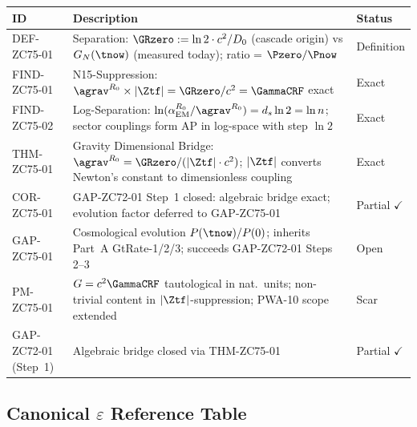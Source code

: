 \documentclass[12pt, a4paper]{article}
\renewcommand{\aEM}{\alpha_{\rm EM}}
\begin{document}
\begin{formalbox}[title={Atomic Registry --- ZC75}]
\begin{center}
\renewcommand{\arraystretch}{1.3}
\small
\begin{tabular}{lp{8.0cm}l}
\toprule
ID & Description & Status \\
\midrule
DEF-ZC75-01
  & Separation: $\GRzero := \ln2 \cdot c^2/D_0$ (cascade origin)
    vs $G_N(\tnow)$ (measured today); ratio = $\Pzero/\Pnow$
  & Definition \\[4pt]
FIND-ZC75-01
  & N15-Suppression: $\agrav^{R_0} \times |\Ztf| = \GRzero/c^2
    = \GammaCRF$ exact
  & Exact \\[4pt]
FIND-ZC75-02
  & Log-Separation: $\ln(\aEM^{R_0}/\agrav^{R_0}) = d_s \ln2 = \ln n$;
    sector couplings form AP in log-space with step $\ln2$
  & Exact \\[4pt]
THM-ZC75-01
  & Gravity Dimensional Bridge: $\agrav^{R_0} = \GRzero/(|\Ztf|\cdot c^2)$;
    $|\Ztf|$ converts Newton's constant to dimensionless coupling
  & Exact \\[4pt]
COR-ZC75-01
  & GAP-ZC72-01 Step~1 closed: algebraic bridge exact;
    evolution factor deferred to GAP-ZC75-01
  & Partial $\checkmark$ \\[4pt]
GAP-ZC75-01
  & Cosmological evolution $P(\tnow)/P(0)$; inherits Part~A
    GtRate-1/2/3; succeeds GAP-ZC72-01 Steps 2--3
  & Open \\[4pt]
PM-ZC75-01
  & $G = c^2\GammaCRF$ tautological in nat.\ units;
    non-trivial content in $|\Ztf|$-suppression;
    PWA-10 scope extended
  & Scar \\
\midrule
GAP-ZC72-01 (Step~1)
  & Algebraic bridge closed via THM-ZC75-01
  & Partial $\checkmark$ \\
\bottomrule
\end{tabular}
\end{center}
\end{formalbox}

\subsection{Canonical $\varepsilon$ Reference Table}
\label{sec:eps-table}
\end{document}
